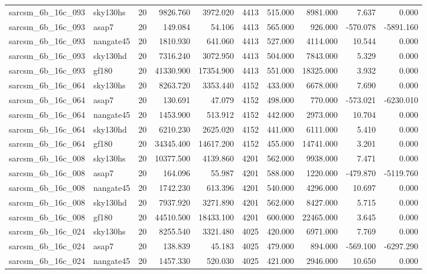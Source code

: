 \begin{tabular}{llrrrrrrrr}
sarcsm\_6b\_16c\_093 & sky130hs & 20 & 9826.760 & 3972.020 & 4413 & 515.000 & 8981.000 & 7.637 & 0.000 \\
sarcsm\_6b\_16c\_093 & asap7 & 20 & 149.084 & 54.106 & 4413 & 565.000 & 926.000 & -570.078 & -5891.160 \\
sarcsm\_6b\_16c\_093 & nangate45 & 20 & 1810.930 & 641.060 & 4413 & 527.000 & 4114.000 & 10.544 & 0.000 \\
sarcsm\_6b\_16c\_093 & sky130hd & 20 & 7316.240 & 3072.950 & 4413 & 504.000 & 7843.000 & 5.329 & 0.000 \\
sarcsm\_6b\_16c\_093 & gf180 & 20 & 41330.900 & 17354.900 & 4413 & 551.000 & 18325.000 & 3.932 & 0.000 \\
sarcsm\_6b\_16c\_064 & sky130hs & 20 & 8263.720 & 3353.440 & 4152 & 433.000 & 6678.000 & 7.690 & 0.000 \\
sarcsm\_6b\_16c\_064 & asap7 & 20 & 130.691 & 47.079 & 4152 & 498.000 & 770.000 & -573.021 & -6230.010 \\
sarcsm\_6b\_16c\_064 & nangate45 & 20 & 1453.900 & 513.912 & 4152 & 442.000 & 2973.000 & 10.704 & 0.000 \\
sarcsm\_6b\_16c\_064 & sky130hd & 20 & 6210.230 & 2625.020 & 4152 & 441.000 & 6111.000 & 5.410 & 0.000 \\
sarcsm\_6b\_16c\_064 & gf180 & 20 & 34345.400 & 14617.200 & 4152 & 455.000 & 14741.000 & 3.201 & 0.000 \\
sarcsm\_6b\_16c\_008 & sky130hs & 20 & 10377.500 & 4139.860 & 4201 & 562.000 & 9938.000 & 7.471 & 0.000 \\
sarcsm\_6b\_16c\_008 & asap7 & 20 & 164.096 & 55.987 & 4201 & 588.000 & 1220.000 & -479.870 & -5119.760 \\
sarcsm\_6b\_16c\_008 & nangate45 & 20 & 1742.230 & 613.396 & 4201 & 540.000 & 4296.000 & 10.697 & 0.000 \\
sarcsm\_6b\_16c\_008 & sky130hd & 20 & 7937.920 & 3271.890 & 4201 & 562.000 & 8427.000 & 5.715 & 0.000 \\
sarcsm\_6b\_16c\_008 & gf180 & 20 & 44510.500 & 18433.100 & 4201 & 600.000 & 22465.000 & 3.645 & 0.000 \\
sarcsm\_6b\_16c\_024 & sky130hs & 20 & 8255.540 & 3321.480 & 4025 & 420.000 & 6971.000 & 7.769 & 0.000 \\
sarcsm\_6b\_16c\_024 & asap7 & 20 & 138.839 & 45.183 & 4025 & 479.000 & 894.000 & -569.100 & -6297.290 \\
sarcsm\_6b\_16c\_024 & nangate45 & 20 & 1457.330 & 520.030 & 4025 & 421.000 & 2946.000 & 10.650 & 0.000 \\

\end{tabular}
